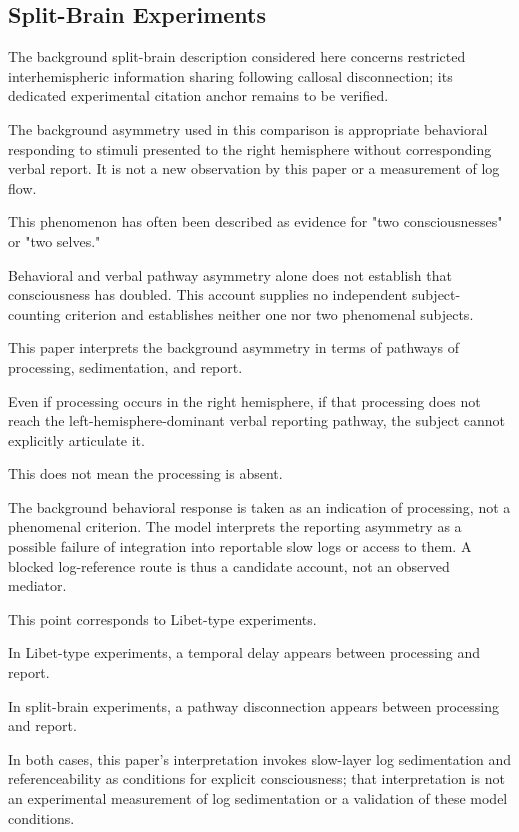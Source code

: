 \subsection{Split-Brain Experiments}


The background split-brain description considered here concerns restricted interhemispheric information sharing following callosal disconnection; its dedicated experimental citation anchor remains to be verified.

The background asymmetry used in this comparison is appropriate behavioral responding to stimuli presented to the right hemisphere without corresponding verbal report. It is not a new observation by this paper or a measurement of log flow.

This phenomenon has often been described as evidence for "two consciousnesses" or "two selves."

Behavioral and verbal pathway asymmetry alone does not establish that consciousness has doubled. This account supplies no independent subject-counting criterion and establishes neither one nor two phenomenal subjects.

This paper interprets the background asymmetry in terms of pathways of processing, sedimentation, and report.

Even if processing occurs in the right hemisphere, if that processing does not reach the left-hemisphere-dominant verbal reporting pathway, the subject cannot explicitly articulate it.

This does not mean the processing is absent.

The background behavioral response is taken as an indication of processing, not a phenomenal criterion. The model interprets the reporting asymmetry as a possible failure of integration into reportable slow logs or access to them. A blocked log-reference route is thus a candidate account, not an observed mediator.

This point corresponds to Libet-type experiments.

In Libet-type experiments, a temporal delay appears between processing and report.

In split-brain experiments, a pathway disconnection appears between processing and report.

In both cases, this paper's interpretation invokes slow-layer log sedimentation and referenceability as conditions for explicit consciousness; that interpretation is not an experimental measurement of log sedimentation or a validation of these model conditions.

